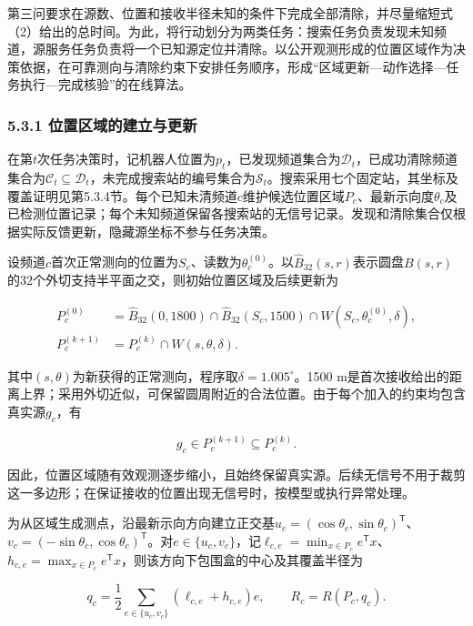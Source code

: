 \documentclass[UTF8,fontset=none,zihao=-4,a4paper]{ctexart}
\begin{document}
第三问要求在源数、位置和接收半径未知的条件下完成全部清除，并尽量缩短式（2）给出的总时间。为此，将行动划分为两类任务：搜索任务负责发现未知频道，源服务任务负责将一个已知源定位并清除。以公开观测形成的位置区域作为决策依据，在可靠测向与清除约束下安排任务顺序，形成``区域更新---动作选择---任务执行---完成核验''的在线算法。

\subsubsection{5.3.1 位置区域的建立与更新}\label{ux4f4dux7f6eux533aux57dfux7684ux5efaux7acbux4e0eux66f4ux65b0}

在第\(t\)次任务决策时，记机器人位置为\(p_t\)，已发现频道集合为\(\mathcal D_t\)，已成功清除频道集合为\(\mathcal C_t\subseteq\mathcal D_t\)，未完成搜索站的编号集合为\(\mathcal S_t\)。搜索采用七个固定站，其坐标及覆盖证明见第5.3.4节。每个已知未清频道\(c\)维护候选位置区域\(P_c\)、最新示向度\(\theta_c\)及已检测位置记录；每个未知频道保留各搜索站的无信号记录。发现和清除集合仅根据实际反馈更新，隐藏源坐标不参与任务决策。

设频道\(c\)首次正常测向的位置为\(S_c\)、读数为\(\theta_c^{(0)}\)。以\(\widehat B_{32}(s,r)\)表示圆盘\(B(s,r)\)的32个外切支持半平面之交，则初始位置区域及后续更新为

\[
\begin{aligned}
P_c^{(0)}&=\widehat B_{32}(0,1800)\cap\widehat B_{32}(S_c,1500)
\cap W(S_c,\theta_c^{(0)},\delta),\\
P_c^{(k+1)}&=P_c^{(k)}\cap W(s,\theta,\delta).
\end{aligned}
\]

其中\((s,\theta)\)为新获得的正常测向，程序取\(\delta=1.005^\circ\)。1500 m是首次接收给出的距离上界；采用外切近似，可保留圆周附近的合法位置。由于每个加入的约束均包含真实源\(g_c\)，有

\[
g_c\in P_c^{(k+1)}\subseteq P_c^{(k)}.
\]

因此，位置区域随有效观测逐步缩小，且始终保留真实源。后续无信号不用于裁剪这一多边形；在保证接收的位置出现无信号时，按模型或执行异常处理。

为从区域生成测点，沿最新示向方向建立正交基\(u_c=(\cos\theta_c,\sin\theta_c)^{\mathsf T}\)、\(v_c=(-\sin\theta_c,\cos\theta_c)^{\mathsf T}\)。对\(e\in\{u_c,v_c\}\)，记\(\ell_{c,e}=\min_{x\in P_c}e^{\mathsf T}x\)、\(h_{c,e}=\max_{x\in P_c}e^{\mathsf T}x\)，则该方向下包围盒的中心及其覆盖半径为

\[
q_c=\frac12\sum_{e\in\{u_c,v_c\}}(\ell_{c,e}+h_{c,e})e,
\qquad R_c=R(P_c,q_c).
\]
\end{document}
